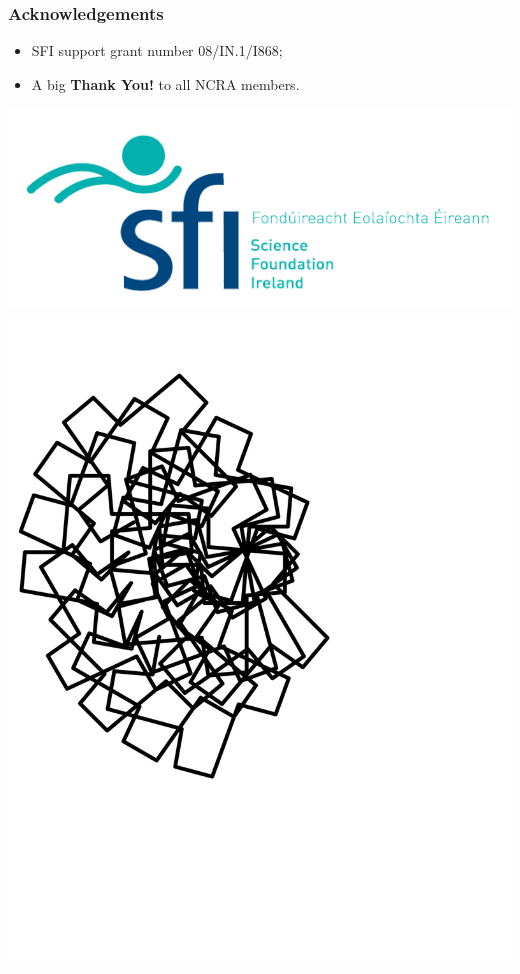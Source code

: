 \documentclass{beamer}
\begin{document}
\begin{frame}
	\frametitle{Acknowledgements}
	\begin{itemize}
		\item SFI support grant number 08/IN.1/I868;
		\item A big \textbf{Thank You!} to all NCRA members.
	\end{itemize}
	\begin{center}
		\includegraphics[width=.35\paperwidth]{SFI}
		\includegraphics[width=.20\paperwidth]{ncralogo}
	\end{center}
\end{frame}
\end{document}
